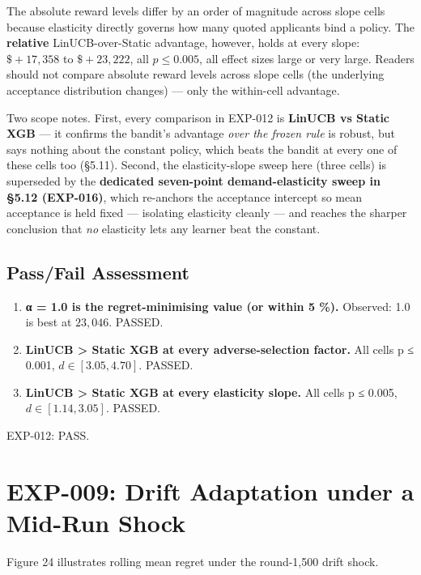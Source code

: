 The absolute reward levels differ by an order of magnitude across slope cells because elasticity directly governs how many quoted applicants bind a policy. The \textbf{relative} LinUCB-over-Static advantage, however, holds at every slope: \(\$+17{,}358\) to \(\$+23{,}222\), all \(p \le 0.005\), all effect sizes large or very large. Readers should not compare absolute reward levels across slope cells (the underlying acceptance distribution changes) --- only the within-cell advantage.

Two scope notes. First, every comparison in EXP-012 is \textbf{LinUCB vs Static XGB} --- it confirms the bandit's advantage \emph{over the frozen rule} is robust, but says nothing about the constant policy, which beats the bandit at every one of these cells too (§5.11). Second, the elasticity-slope sweep here (three cells) is superseded by the \textbf{dedicated seven-point demand-elasticity sweep in §5.12 (EXP-016)}, which re-anchors the acceptance intercept so mean acceptance is held fixed --- isolating elasticity cleanly --- and reaches the sharper conclusion that \emph{no} elasticity lets any learner beat the constant.

\subsection{Pass/Fail Assessment}\label{passfail-assessment-5}

\begin{enumerate}
\def\labelenumi{\arabic{enumi}.}
\tightlist
\item
  \textbf{α = 1.0 is the regret-minimising value (or within 5 \%).} Observed: 1.0 is best at \(23{,}046\). PASSED.
\item
  \textbf{LinUCB \textgreater{} Static XGB at every adverse-selection factor.} All cells p ≤ 0.001, \(d \in [3.05, 4.70]\). PASSED.
\item
  \textbf{LinUCB \textgreater{} Static XGB at every elasticity slope.} All cells p ≤ 0.005, \(d \in [1.14, 3.05]\). PASSED.
\end{enumerate}

EXP-012: PASS.

\section{EXP-009: Drift Adaptation under a Mid-Run Shock}\label{exp-009-drift-adaptation-under-a-mid-run-shock}

Figure 24 illustrates rolling mean regret under the round-1,500 drift shock.

